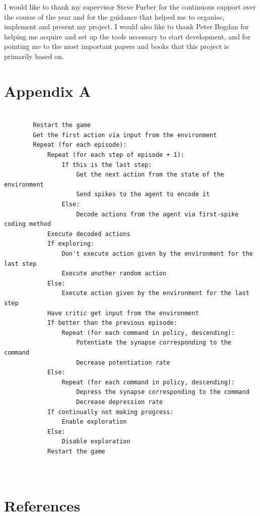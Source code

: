 \documentclass[10pt]{article}
\begin{document}
    I would like to thank my supervisor Steve Furber for the continuous support over the course of the year and for the guidance that helped me to organise, implement and present my project. I would also like to thank Peter Bogdan for helping me acquire and set up the tools necessary to start development, and for pointing me to the most important papers and books that this project is primarily based on.
    
    \onecolumn

    \newpage
    \section*{Appendix A}

    \begin{lstlisting}[]

        Restart the game
        Get the first action via input from the environment
        Repeat (for each episode):
            Repeat (for each step of episode + 1):
                If this is the last step:
                    Get the next action from the state of the environment
                    Send spikes to the agent to encode it
                Else:
                    Decode actions from the agent via first-spike coding method
            Execute decoded actions
            If exploring:
                Don't execute action given by the environment for the last step
                Execute another random action
            Else:
                Execute action given by the environment for the last step
            Have critic get input from the environment
            If better than the previous episode:
                Repeat (for each command in policy, descending):
                    Potentiate the synapse corresponding to the command
                    Decrease potentiation rate
            Else:
                Repeat (for each command in policy, descending):
                    Depress the synapse corresponding to the command
                    Decrease depression rate
            If continually not making progress:
                Enable exploration
            Else:
                Disable exploration
            Restart the game
    
    
    \end{lstlisting}    
        
    \newpage
    
    \section*{References}
\end{document}
